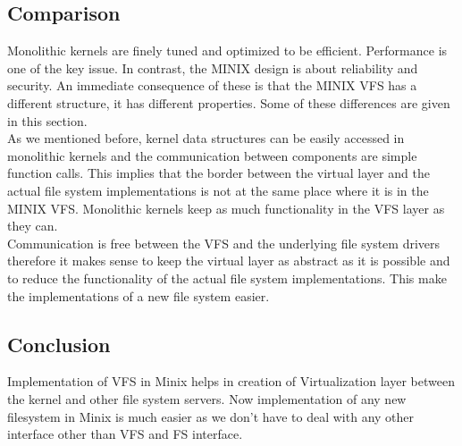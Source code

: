\subsection{Comparison}
Monolithic kernels are finely tuned and optimized to be efficient. Performance is one of the key issue. In contrast, the MINIX design is about reliability and security. An immediate consequence of these is that the MINIX VFS has a different structure, it has different properties. Some of these differences are given in this section.\\

As we mentioned before, kernel data structures can be easily accessed in monolithic kernels and the communication between components are simple function calls. This implies that the border between the virtual layer and the actual file system implementations is not at the same place where it is in the MINIX VFS. Monolithic kernels keep as much functionality in the VFS layer as they can.\\

Communication is free between the VFS and the underlying file system drivers therefore it makes sense to keep the virtual layer as abstract as it is possible and to reduce the functionality of the actual file system implementations. This make the implementations of a new file system easier. 

\subsection{Conclusion}

Implementation of VFS in Minix helps in creation of Virtualization layer between the kernel and other file system servers. Now implementation of any new filesystem in Minix is much easier as we don't have to deal with any other interface other than VFS and FS interface.

